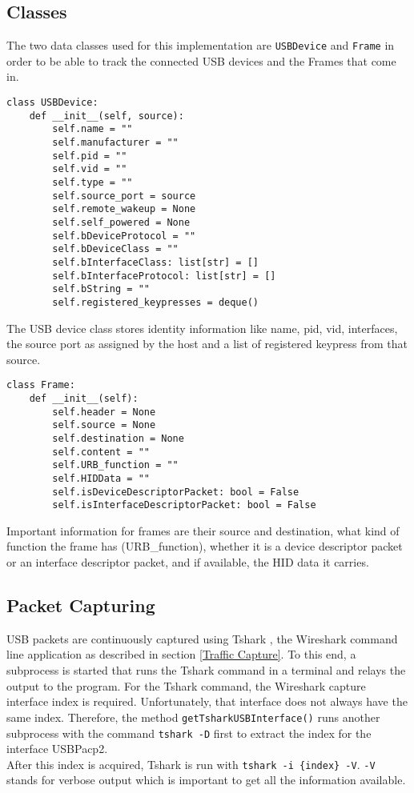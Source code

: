 \subsection{Classes}

The two data classes used for this implementation are \verb|USBDevice| and \verb|Frame| in order to be able to track the connected USB devices and the Frames that come in.

\begin{lstlisting}
class USBDevice:
    def __init__(self, source):
        self.name = ""
        self.manufacturer = ""
        self.pid = ""
        self.vid = ""
        self.type = ""
        self.source_port = source
        self.remote_wakeup = None
        self.self_powered = None
        self.bDeviceProtocol = ""
        self.bDeviceClass = ""
        self.bInterfaceClass: list[str] = []
        self.bInterfaceProtocol: list[str] = []
        self.bString = ""
        self.registered_keypresses = deque()
\end{lstlisting}

The USB device class stores identity information like name, pid, vid, interfaces, the source port as assigned by the host and a list of registered keypress from that source.

\begin{lstlisting}
class Frame:
    def __init__(self):
        self.header = None
        self.source = None
        self.destination = None
        self.content = ""
        self.URB_function = ""
        self.HIDData = ""
        self.isDeviceDescriptorPacket: bool = False
        self.isInterfaceDescriptorPacket: bool = False
\end{lstlisting}

Important information for frames are their source and destination, what kind of function the frame has (URB_function), whether it is a device descriptor packet or an interface descriptor packet, and if available, the HID data it carries.


\subsection{Packet Capturing}

USB packets are continuously captured using Tshark \cite{TsharkTsharkDev}, the Wireshark command line application as described in section \ref{Traffic Capture}. To this end, a subprocess is started that runs the Tshark command in a terminal and relays the output to the program.
For the Tshark command, the Wireshark capture interface index is required. Unfortunately, that interface does not always have the same index. Therefore, the method \verb|getTsharkUSBInterface()| runs another subprocess with the command \verb|tshark -D| first to extract the index for the interface USBPacp2.  \\
After this index is acquired, Tshark is run with \verb|tshark -i {index} -V|. \verb|-V| stands for verbose output which is important to get all the information available.  


